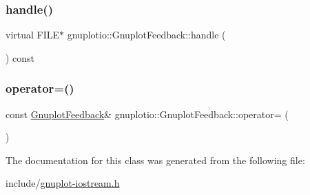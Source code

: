 \subsubsection{\texorpdfstring{handle()}{handle()}}
{\footnotesize\ttfamily virtual F\+I\+LE$\ast$ gnuplotio\+::\+Gnuplot\+Feedback\+::handle (\begin{DoxyParamCaption}{ }\end{DoxyParamCaption}) const\hspace{0.3cm}{\ttfamily [pure virtual]}}

\mbox{\label{classgnuplotio_1_1_gnuplot_feedback_a5ac331bbedeb44701b35965963ea0510}} 
\subsubsection{\texorpdfstring{operator=()}{operator=()}}
{\footnotesize\ttfamily const \hyperlink{classgnuplotio_1_1_gnuplot_feedback}{Gnuplot\+Feedback}\& gnuplotio\+::\+Gnuplot\+Feedback\+::operator= (\begin{DoxyParamCaption}\item[{const \hyperlink{classgnuplotio_1_1_gnuplot_feedback}{Gnuplot\+Feedback} \&}]{ }\end{DoxyParamCaption})\hspace{0.3cm}{\ttfamily [private]}}



The documentation for this class was generated from the following file\+:\begin{DoxyCompactItemize}
\item 
include/\hyperlink{gnuplot-iostream_8h}{gnuplot-\/iostream.\+h}\end{DoxyCompactItemize}
